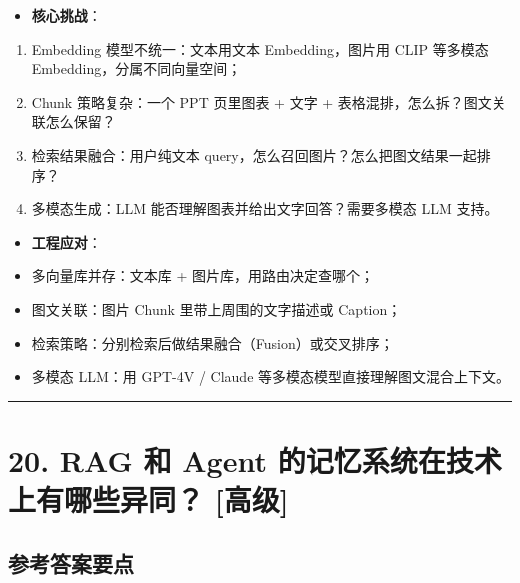 \documentclass[9pt,a4paper,twocolumn]{ctexart}
\newcommand{\lvgao}{\usebox{\badgegaobox}}
\def\lvgao{[高级]}%
\begin{document}
\begin{itemize}[itemsep=1pt, topsep=2pt]
  \item \textbf{核心挑战}：
\end{itemize}
\begin{enumerate}[itemsep=1pt, topsep=2pt]
  \item Embedding 模型不统一：文本用文本 Embedding，图片用 CLIP 等多模态 Embedding，分属不同向量空间；
  \item Chunk 策略复杂：一个 PPT 页里图表 + 文字 + 表格混排，怎么拆？图文关联怎么保留？
  \item 检索结果融合：用户纯文本 query，怎么召回图片？怎么把图文结果一起排序？
  \item 多模态生成：LLM 能否理解图表并给出文字回答？需要多模态 LLM 支持。
\end{enumerate}
\begin{itemize}[itemsep=1pt, topsep=2pt]
  \item \textbf{工程应对}：
  \item 多向量库并存：文本库 + 图片库，用路由决定查哪个；
  \item 图文关联：图片 Chunk 里带上周围的文字描述或 Caption；
  \item 检索策略：分别检索后做结果融合（Fusion）或交叉排序；
  \item 多模态 LLM：用 GPT-4V / Claude 等多模态模型直接理解图文混合上下文。
\end{itemize}


\vspace{2pt}
\noindent\rule{\columnwidth}{0.3pt}\vspace{2pt}



\section*{20. RAG 和 Agent 的记忆系统在技术上有哪些异同？ \lvgao{}}


\subsection*{参考答案要点}
\end{document}
